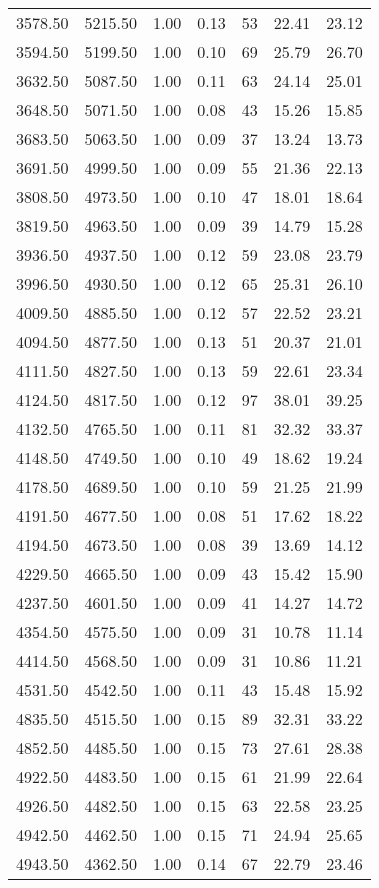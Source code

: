 \begin{table}
\begin{tabular}{rrrrrrr}
3578.50 & 5215.50 & 1.00 & 0.13 & 53 & 22.41 & 23.12 \\
3594.50 & 5199.50 & 1.00 & 0.10 & 69 & 25.79 & 26.70 \\
3632.50 & 5087.50 & 1.00 & 0.11 & 63 & 24.14 & 25.01 \\
3648.50 & 5071.50 & 1.00 & 0.08 & 43 & 15.26 & 15.85 \\
3683.50 & 5063.50 & 1.00 & 0.09 & 37 & 13.24 & 13.73 \\
3691.50 & 4999.50 & 1.00 & 0.09 & 55 & 21.36 & 22.13 \\
3808.50 & 4973.50 & 1.00 & 0.10 & 47 & 18.01 & 18.64 \\
3819.50 & 4963.50 & 1.00 & 0.09 & 39 & 14.79 & 15.28 \\
3936.50 & 4937.50 & 1.00 & 0.12 & 59 & 23.08 & 23.79 \\
3996.50 & 4930.50 & 1.00 & 0.12 & 65 & 25.31 & 26.10 \\
4009.50 & 4885.50 & 1.00 & 0.12 & 57 & 22.52 & 23.21 \\
4094.50 & 4877.50 & 1.00 & 0.13 & 51 & 20.37 & 21.01 \\
4111.50 & 4827.50 & 1.00 & 0.13 & 59 & 22.61 & 23.34 \\
4124.50 & 4817.50 & 1.00 & 0.12 & 97 & 38.01 & 39.25 \\
4132.50 & 4765.50 & 1.00 & 0.11 & 81 & 32.32 & 33.37 \\
4148.50 & 4749.50 & 1.00 & 0.10 & 49 & 18.62 & 19.24 \\
4178.50 & 4689.50 & 1.00 & 0.10 & 59 & 21.25 & 21.99 \\
4191.50 & 4677.50 & 1.00 & 0.08 & 51 & 17.62 & 18.22 \\
4194.50 & 4673.50 & 1.00 & 0.08 & 39 & 13.69 & 14.12 \\
4229.50 & 4665.50 & 1.00 & 0.09 & 43 & 15.42 & 15.90 \\
4237.50 & 4601.50 & 1.00 & 0.09 & 41 & 14.27 & 14.72 \\
4354.50 & 4575.50 & 1.00 & 0.09 & 31 & 10.78 & 11.14 \\
4414.50 & 4568.50 & 1.00 & 0.09 & 31 & 10.86 & 11.21 \\
4531.50 & 4542.50 & 1.00 & 0.11 & 43 & 15.48 & 15.92 \\
4835.50 & 4515.50 & 1.00 & 0.15 & 89 & 32.31 & 33.22 \\
4852.50 & 4485.50 & 1.00 & 0.15 & 73 & 27.61 & 28.38 \\
4922.50 & 4483.50 & 1.00 & 0.15 & 61 & 21.99 & 22.64 \\
4926.50 & 4482.50 & 1.00 & 0.15 & 63 & 22.58 & 23.25 \\
4942.50 & 4462.50 & 1.00 & 0.15 & 71 & 24.94 & 25.65 \\
4943.50 & 4362.50 & 1.00 & 0.14 & 67 & 22.79 & 23.46 \\
\bottomrule
\end{tabular}
\end{table}
